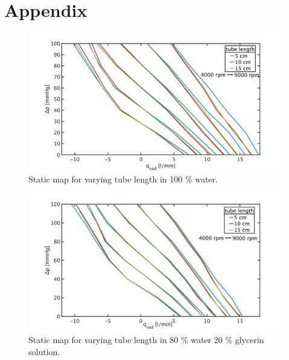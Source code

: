 \chapter{Appendix}
\begin{figure}[ht!]
  \includegraphics[width=\textwidth]{images/chapt_4/100w_tube_length_new.pdf}
  \caption[Static map for different tube length in 100 \% water]{Static map for varying tube length in 100 \% water.}
  \label{fig:anh_1}
\end{figure}

\begin{figure}[ht!]
  \includegraphics[width=\textwidth]{images/chapt_4/80w20g_tube_length_new.pdf}
  \caption[Static map for different tube length in 80 \% water 20 \% glycerin solution]{Static map for varying tube length in 80 \% water 20 \% glycerin solution.}
 \label{fig:anh_2}
\end{figure}

